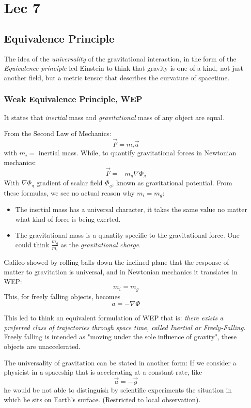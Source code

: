 \section{Lec 7}

\subsection{Equivalence Principle}

The idea of the \emph{universality} of the gravitational interaction, in the form of the \emph{Equivalence principle } led Einstein to think that gravity is one of a kind, not just another field, but a metric tensor that describes the curvature of spacetime.

\subsubsection{Weak Equivalence Principle, WEP}
It states that \emph{inertial} mass and \emph{gravitational} mass of any object are equal. \par
From the Second Law of Mechanics:
\[
 \vec{F}= m_{i}\vec{a}
\]
with $m_{i}=$ inertial mass.
While, to quantify gravitational forces in Newtonian mechanics:
\[
\vec{F} = -m_{g} \nabla \Phi_{g}
\]
With $\nabla \Phi_{g}$ gradient of scalar field $\Phi_{g}$, known as gravitational potential.
From these formulas, we see no actual reason why $m_{i} = m_{g}$:
\begin{itemize}
	\item The inertial mass has a universal character, it takes the same value no matter what kind of force is being exerted.
	\item The gravitational mass is a quantity specific to the gravitational force. One could think $ \frac{m_{g}}{m_{i}}$ as the \emph{gravitational charge}.
\end{itemize}
Galileo showed by rolling balls down the inclined plane that the response of matter to gravitation is universal, and in Newtonian mechanics it translates in WEP:
\[
m_{i }= m_{g}
\]
This, for freely falling objects, becomes
\[
a = -\nabla \Phi 
\]

This led to think an equivalent formulation of WEP that is: \emph{there exists a preferred class of trajectories through space time, called Inertial or Freely-Falling}.
Freely falling is intended as "moving under the sole influence of gravity", these objects are unaccelerated. \par

The universality of gravitation can be stated in another form:
\indent If we consider a physicist in a spaceship that is accelerating at a constant rate, like
\[
\vec{a} = - \vec{g}
\]
he would be not able to distinguish by scientific experiments the situation in which he sits on Earth's surface. (Restricted to local observation).


